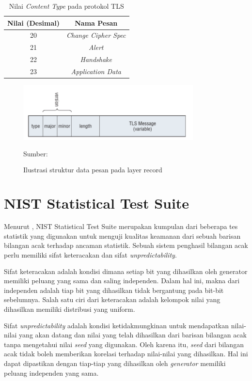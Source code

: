 \begin{table}[!h]
  \centering
  \caption{Nilai \emph{Content Type} pada protokol TLS} \label{tab:tls.contenttype}
  \begin{tabular}{|c|c|}
    \hline
    \textbf{Nilai (Desimal)} & \textbf{Nama Pesan} \\
    \hline
    20 & \emph{Change Cipher Spec} \\ \hline
    21 & \emph{Alert} \\ \hline
    22 & \emph{Handshake} \\ \hline
    23 & \emph{Application Data} \\
    \hline
  \end{tabular}
\end{table}

\begin{figure}[!h]
  \centering
  \includegraphics[width=350px]{chapters/res/chapter-2/img/tls.record.png}
  \caption{Ilustrasi struktur data pesan pada layer record} \label{fig:tls.record}
  Sumber: \textcite{joshua2011}
\end{figure}

\section{NIST Statistical Test Suite}
\label{sec:nist.statistical.test}

Menurut \textcite{rukhin2010}, NIST Statistical Test Suite merupakan kumpulan dari beberapa tes statistik yang digunakan untuk menguji kualitas keamanan dari sebuah barisan bilangan acak terhadap ancaman statistik. Sebuah sistem penghasil bilangan acak perlu memiliki sifat keteracakan dan sifat \emph{unpredictability}. 

Sifat keteracakan adalah kondisi dimana setiap bit yang dihasilkan oleh generator memiliki peluang yang sama dan saling independen. Dalam hal ini, makna dari independen adalah tiap bit yang dihasilkan tidak bergantung pada bit-bit sebelumnya. Salah satu ciri dari keteracakan adalah kelompok nilai yang dihasilkan memiliki distribusi yang uniform.

Sifat \emph{unpredictability} adalah kondisi ketidakmungkinan untuk mendapatkan nilai-nilai yang akan datang dan nilai yang telah dihasilkan dari barisan bilangan acak tanpa mengetahui nilai \emph{seed} yang digunakan. Oleh karena itu, \emph{seed} dari bilangan acak tidak boleh memberikan korelasi terhadap nilai-nilai yang dihasilkan. Hal ini dapat dipastikan dengan tiap-tiap yang dihasilkan oleh \emph{generator} memiliki peluang independen yang sama.


